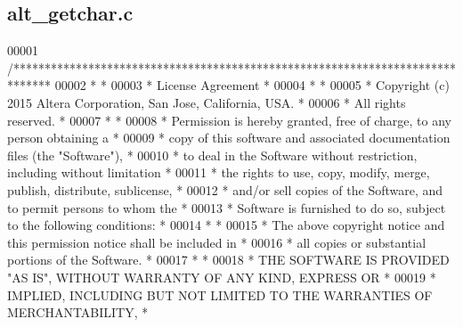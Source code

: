 \subsection{alt\+\_\+getchar.\+c}
\label{alt__getchar_8c_source}

\begin{DoxyCode}
00001 \textcolor{comment}{/******************************************************************************}
00002 \textcolor{comment}{*                                                                             *}
00003 \textcolor{comment}{* License Agreement                                                           *}
00004 \textcolor{comment}{*                                                                             *}
00005 \textcolor{comment}{* Copyright (c) 2015 Altera Corporation, San Jose, California, USA.           *}
00006 \textcolor{comment}{* All rights reserved.                                                        *}
00007 \textcolor{comment}{*                                                                             *}
00008 \textcolor{comment}{* Permission is hereby granted, free of charge, to any person obtaining a     *}
00009 \textcolor{comment}{* copy of this software and associated documentation files (the "Software"),  *}
00010 \textcolor{comment}{* to deal in the Software without restriction, including without limitation   *}
00011 \textcolor{comment}{* the rights to use, copy, modify, merge, publish, distribute, sublicense,    *}
00012 \textcolor{comment}{* and/or sell copies of the Software, and to permit persons to whom the       *}
00013 \textcolor{comment}{* Software is furnished to do so, subject to the following conditions:        *}
00014 \textcolor{comment}{*                                                                             *}
00015 \textcolor{comment}{* The above copyright notice and this permission notice shall be included in  *}
00016 \textcolor{comment}{* all copies or substantial portions of the Software.                         *}
00017 \textcolor{comment}{*                                                                             *}
00018 \textcolor{comment}{* THE SOFTWARE IS PROVIDED "AS IS", WITHOUT WARRANTY OF ANY KIND, EXPRESS OR  *}
00019 \textcolor{comment}{* IMPLIED, INCLUDING BUT NOT LIMITED TO THE WARRANTIES OF MERCHANTABILITY,    *}

\end{DoxyCode}
